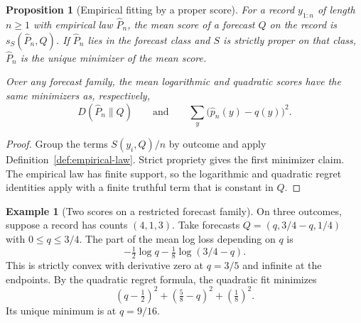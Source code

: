 \documentclass[11pt,oneside]{book}
\newtheorem{proposition}[theorem]{Proposition}
\theoremstyle{definition}
\newtheorem{example}[theorem]{Example}
\theoremstyle{remark}
\begin{document}
\begin{proposition}[Empirical fitting by a proper score]
\label{prop:proper-score-empirical}
For a record $y_{1:n}$ of length $n\geq1$ with empirical law
$\widehat P_n$, the mean score of a forecast $Q$ on the record is
$s_S(\widehat P_n,Q)$. If $\widehat P_n$ lies in the forecast class
and $S$ is strictly proper on that class, $\widehat P_n$ is the
unique minimizer of the mean score.

Over any forecast family, the mean logarithmic and quadratic scores
have the same minimizers as, respectively,
\[
D(\widehat P_n\|Q)
\qquad\text{and}\qquad
\sum_y\bigl(\widehat p_n(y)-q(y)\bigr)^2.
\]
\end{proposition}
\begin{proof}
Group the terms $S(y_i,Q)/n$ by outcome and apply
Definition~\ref{def:empirical-law}. Strict propriety gives the
first minimizer claim. The empirical law has finite support, so
the logarithmic and quadratic regret identities apply with a
finite truthful term that is constant in $Q$.
\end{proof}

\begin{example}[Two scores on a restricted forecast family]
\label{ex:proper-scores-restricted-fit}
On three outcomes, suppose a record has counts $(4,1,3)$.
Take forecasts $Q=(q,3/4-q,1/4)$ with $0\leq q\leq3/4$.
The part of the mean log loss depending on $q$ is
\[
-\tfrac12\log q-\tfrac18\log(3/4-q).
\]
This is strictly convex with derivative zero at $q=3/5$ and
infinite at the endpoints. By the quadratic regret formula, the
quadratic fit minimizes
\[
(q-\tfrac12)^2+(\tfrac58-q)^2+(\tfrac18)^2.
\]
Its unique minimum is at $q=9/16$.
\end{example}
\end{document}
